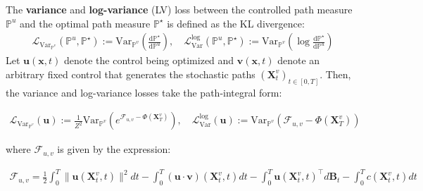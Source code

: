 \documentclass{article}
\begin{document}
\begin{definition}\label{def:soc-log-variance}
    The \textbf{variance} and \textbf{log-variance} (LV) loss between the controlled path measure $\mathbb{P}^u$ and the optimal path measure $\mathbb{P}^\star$ is defined as the KL divergence:
    \begin{align}
        \mathcal{L}_{\text{Var}_{\mathbb{P}^v}}(\mathbb{P}^u, \mathbb{P}^\star):=\text{Var}_{\mathbb{P}^v}\left( \frac{\mathrm{d}\mathbb{P}^\star}{\mathrm{d}\mathbb{P}^u}\right), \quad\mathcal{L}^{\text{log}}_{\text{Var}}(\mathbb{P}^u, \mathbb{P}^\star):=\text{Var}_{\mathbb{P}^v}\left(\log \frac{\mathrm{d}\mathbb{P}^\star}{\mathrm{d}\mathbb{P}^u}\right)
    \end{align}
    Let $\boldsymbol{u}(\boldsymbol{x},t)$ denote the control being optimized and $\boldsymbol{v}(\boldsymbol{x},t)$ denote an arbitrary fixed control that generates the stochastic paths $(\boldsymbol{X}_t^v)_{t\in [0,T]}$. Then, the variance and log-variance losses take the path-integral form:
    \begin{small}
    \begin{align}
        \mathcal{L}_{\text{Var}_{\mathbb{P}^v}}(\boldsymbol{u}):=\frac{1}{Z^2}\text{Var}_{\mathbb{P}^v}\left(e^{\mathcal{F}_{u,v}-\Phi(\boldsymbol{X}_T^v)}\right), \quad\mathcal{L}^{\text{log}}_{\text{Var}}(\boldsymbol{u}):=\text{Var}_{\mathbb{P}^v}\left(\mathcal{F}_{u,v}-\Phi(\boldsymbol{X}_T^v)\right)\tag{Variance Losses}\label{eq:variance-losses}
    \end{align}
    \end{small}
    where $\mathcal{F}_{u,v}$ is given by the expression:
    \begin{small}
    \begin{align}
        \mathcal{F}_{u,v}=\frac{1}{2}\int_0^T\|\boldsymbol{u}(\boldsymbol{X}_t^v,t)\|^2dt-\int_0^T(\boldsymbol{u}\cdot \boldsymbol{v})(\boldsymbol{X}^v_t,t)dt-\int_0^T\boldsymbol{u}(\boldsymbol{X}_t^v,t)^\top d \boldsymbol{B}_t-\int_0^Tc(\boldsymbol{X}_t^v ,t)dt
    \end{align}
    \end{small}
\end{definition}
\end{document}
